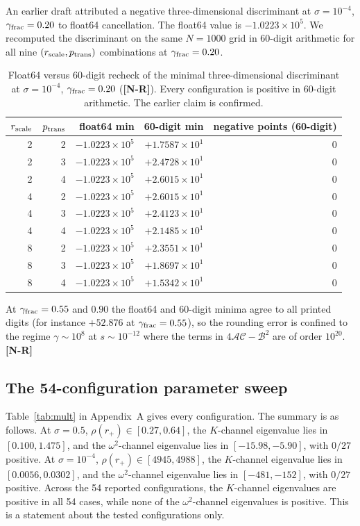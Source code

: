 \documentclass[11pt,a4paper]{article}
\newcommand{\VN}{\textcolor{vn}{\textbf{[N-R]}}}
\theoremstyle{remark}
\theoremstyle{definition}
\begin{document}
An earlier draft attributed a negative three-dimensional discriminant at $\sigma = 10^{-4}$, $\gamma_{\rm frac} = 0.20$ to float64 cancellation. The float64 value is $-1.0223\times10^5$. We recomputed the discriminant on the same $N=1000$ grid in 60-digit arithmetic for all nine $(r_{\rm scale}, p_{\rm trans})$ combinations at $\gamma_{\rm frac}=0.20$.

\begin{table}[H]
\centering
\caption{Float64 versus 60-digit recheck of the minimal three-dimensional discriminant at $\sigma = 10^{-4}$, $\gamma_{\rm frac} = 0.20$ (\VN). Every configuration is positive in 60-digit arithmetic. The earlier claim is confirmed.}
\label{tab:disc}
\begin{tabular}{@{}rrrrr@{}}
\toprule
$r_{\rm scale}$ & $p_{\rm trans}$ & float64 min & 60-digit min & negative points (60-digit) \\
\midrule
2 & 2 & $-1.0223\times10^5$ & $+1.7587\times10^1$ & 0 \\
2 & 3 & $-1.0223\times10^5$ & $+2.4728\times10^1$ & 0 \\
2 & 4 & $-1.0223\times10^5$ & $+2.6015\times10^1$ & 0 \\
4 & 2 & $-1.0223\times10^5$ & $+2.6015\times10^1$ & 0 \\
4 & 3 & $-1.0223\times10^5$ & $+2.4123\times10^1$ & 0 \\
4 & 4 & $-1.0223\times10^5$ & $+2.1485\times10^1$ & 0 \\
8 & 2 & $-1.0223\times10^5$ & $+2.3551\times10^1$ & 0 \\
8 & 3 & $-1.0223\times10^5$ & $+1.8697\times10^1$ & 0 \\
8 & 4 & $-1.0223\times10^5$ & $+1.5342\times10^1$ & 0 \\
\bottomrule
\end{tabular}
\end{table}

At $\gamma_{\rm frac} = 0.55$ and $0.90$ the float64 and 60-digit minima agree to all printed digits (for instance $+52.876$ at $\gamma_{\rm frac}=0.55$), so the rounding error is confined to the regime $\gamma\sim 10^8$ at $s\sim 10^{-12}$ where the terms in $4\mathcal{A}\mathcal{C} - \mathcal{B}^2$ are of order $10^{20}$. \VN

\subsection{The 54-configuration parameter sweep}

Table~\ref{tab:mult} in Appendix~A gives every configuration. The summary is as follows. At $\sigma = 0.5$, $\rho(r_+) \in [0.27, 0.64]$, the $K$-channel eigenvalue lies in $[0.100, 1.475]$, and the $\omega^2$-channel eigenvalue lies in $[-15.98, -5.90]$, with $0/27$ positive. At $\sigma = 10^{-4}$, $\rho(r_+) \in [4945, 4988]$, the $K$-channel eigenvalue lies in $[0.0056, 0.0302]$, and the $\omega^2$-channel eigenvalue lies in $[-481, -152]$, with $0/27$ positive. Across the 54 reported configurations, the $K$-channel eigenvalues are positive in all 54 cases, while none of the $\omega^2$-channel eigenvalues is positive. This is a statement about the tested configurations only.
\end{document}
